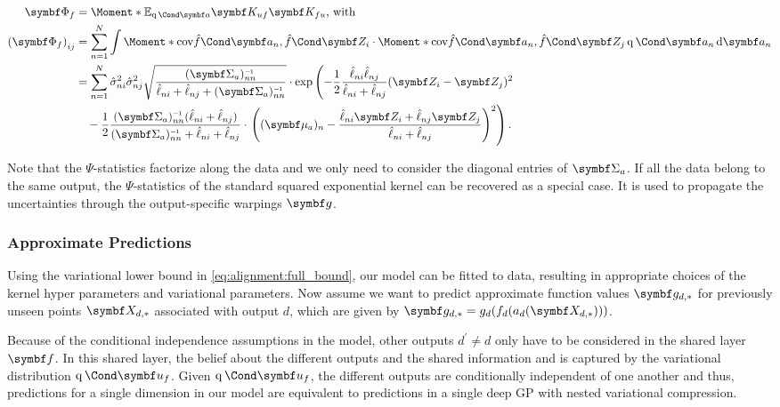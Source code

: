 \begin{align}
    \begin{split}
        \mat{\Phi_f} &= \Moment*{\E_{\Variat{\rv{a}}}}{\mat{K_{uf}}\mat{K_{fu}}}\text{, with} \\
        \left(\mat{\Phi_f} \right)_{ij} &= \sum_{n=1}^N \int \Moment*{\cov}{\Fun{\hat{f}}{\mat{a}_n}, \Fun{\hat{f}}{\mat{Z}_i}}
        \cdot \Moment*{\cov}{\Fun{\hat{f}}{\mat{a}_n}, \Fun{\hat{f}}{\mat{Z}_j}} \Variat{\rv{a}_n} \diff \rv{a}_n \\
        &= \sum_{n=1}^N \hat{\sigma}_{ni}^2 \hat{\sigma}_{nj}^2 \sqrt{\frac{(\mat{\Sigma}_a)_{nn}\inv}{\hat{\ell}_{ni} + \hat{\ell}_{nj} + (\mat{\Sigma}_a)_{nn}\inv}}
        \cdot \exp\left( -\frac{1}{2} \frac{\hat{\ell}_{ni}\hat{\ell}_{nj}}{\hat{\ell}_{ni} + \hat{\ell}_{nj}} (\mat{Z}_i - \mat{Z}_j)^2 \right. \\
        &\quad {} - \frac{1}{2} \frac{(\mat{\Sigma}_a)_{nn}\inv(\hat{\ell}_{ni} + \hat{\ell}_{nj})}{(\mat{\Sigma}_a)_{nn}\inv + \hat{\ell}_{ni} + \hat{\ell}_{nj}}
        \cdot \left.\left( (\mat{\mu}_a)_n - \frac{\hat{\ell}_{ni} \mat{Z}_i + \hat{\ell}_{nj} \mat{Z}_j}{\hat{\ell}_{ni} + \hat{\ell}_{nj}} \right)^2 \right).
    \end{split}
\end{align}

Note that the $\Psi$-statistics factorize along the data and we only need to consider the diagonal entries of $\mat{\Sigma}_a$.
If all the data belong to the same output, the $\Psi$-statistics of the standard squared exponential kernel can be recovered as a special case.
It is used to propagate the uncertainties through the output-specific warpings $\rv{g}$.

\subsubsection{Approximate Predictions}
Using the variational lower bound in \cref{eq:alignment:full_bound}, our model can be fitted to data, resulting in appropriate choices of the kernel hyper parameters and variational parameters.
Now assume we want to predict approximate function values $\mat{g}_{d, \ast}$ for previously unseen points $\mat{X}_{d, \ast}$ associated with output $d$, which are given by $ \mat{g}_{d, \ast} = g_d(f_d(a_d(\mat{X}_{d, \ast})))$.

Because of the conditional independence assumptions in the model, other outputs $d^\prime \neq d$ only have to be considered in the shared layer $\rv{f}$.
In this shared layer, the belief about the different outputs and the shared information and is captured by the variational distribution $\Variat{\rv{u}_f}$.
Given $\Variat{\rv{u}_f}$, the different outputs are conditionally independent of one another and thus, predictions for a single dimension in our model are equivalent to predictions in a single deep GP with nested variational compression.



